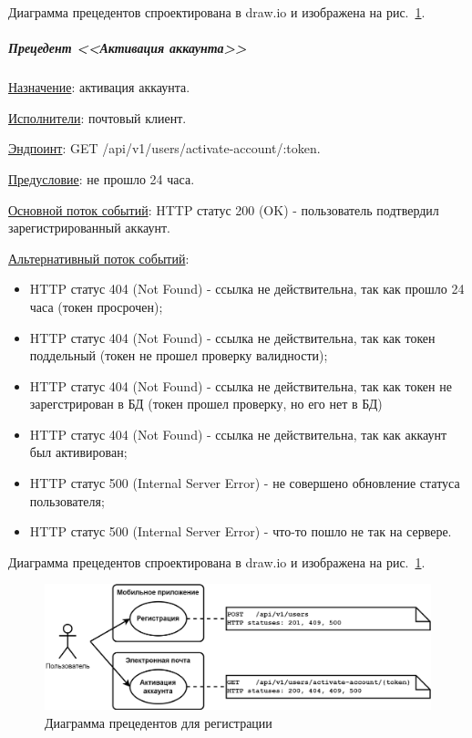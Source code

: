 Диаграмма прецедентов спроектирована в draw.io \cite{drawio} и изображена на рис.~\ref{fig:UML_precedent_registration}.


\subparagraph{Прецедент <<Активация аккаунта>>} \hspace{0pt}

\underline{Назначение}: активация аккаунта.

\underline{Исполнители}: почтовый клиент.

\underline{Эндпоинт}: GET /api/v1/users/activate-account/:token.

\underline{Предусловие}: не прошло 24 часа.

\underline{Основной поток событий}: HTTP статус 200 (OK) - пользователь подтвердил зарегистрированный аккаунт.

\underline{Альтернативный поток событий}:

\begin{itemize}
    \item HTTP статус 404 (Not Found) - ссылка не действительна, так как прошло 24 часа (токен просрочен);
    \item HTTP статус 404 (Not Found) - ссылка не действительна, так как токен поддельный (токен не прошел проверку валидности);
    \item HTTP статус 404 (Not Found) - ссылка не действительна, так как токен не зарегстрирован в БД (токен прошел проверку, но его нет в БД)
    \item HTTP статус 404 (Not Found) - ссылка не действительна, так как аккаунт был активирован;
    \item HTTP статус 500 (Internal Server Error) - не совершено обновление статуса пользователя;
    \item HTTP статус 500 (Internal Server Error) - что-то пошло не так на сервере.
\end{itemize}

Диаграмма прецедентов спроектирована в draw.io \cite{drawio} и изображена на рис.~\ref{fig:UML_precedent_registration}.


\begin{figure}[!htb]
    \centering

    \includegraphics[width=18cm]
    {images/UML/UML_precedent_registration.png}

    \caption{Диаграмма прецедентов для регистрации}

    \label{fig:UML_precedent_registration}
\end{figure}

